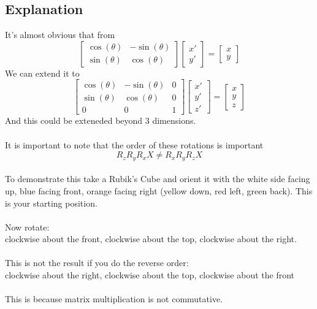 \subsection{Explanation}
It's almost obvious that from \\
\[
\left[ \begin{matrix}
\cos(\theta) & -\sin(\theta) \\
\sin(\theta) &  \cos(\theta) 
\end{matrix}\right] 
\left[ \begin{matrix}
x' \\
y'
\end{matrix} \right] =
\left[ \begin{matrix}
x \\
y
\end{matrix} \right]
\]
We can extend it to\\
\[
\left[ \begin{matrix}
\cos(\theta) & -\sin(\theta) & 0\\
\sin(\theta) &  \cos(\theta) & 0\\
0 & 0 & 1
\end{matrix}\right] 
\left[ \begin{matrix}
x' \\
y' \\
z'
\end{matrix} \right] =
\left[ \begin{matrix}
x \\
y \\
z
\end{matrix} \right]
\]
And this could be exteneded beyond 3 dimensions.\\
\\
It is important to note that the order of these rotations is important
\[R_zR_yR_xX \ne R_xR_yR_zX\]
\\
To demonstrate this take a Rubik's Cube and orient it with the white side facing up, blue facing front, orange facing right (yellow down, red left, green back).  This is your starting position. \\
\\
Now rotate:\\
clockwise about the front, clockwise about the top, clockwise about the right.\\
\\
This is not the result if you do the reverse order:\\
clockwise about the right, clockwise about the top, clockwise about the front\\
\\
This is because matrix multiplication is not commutative.


